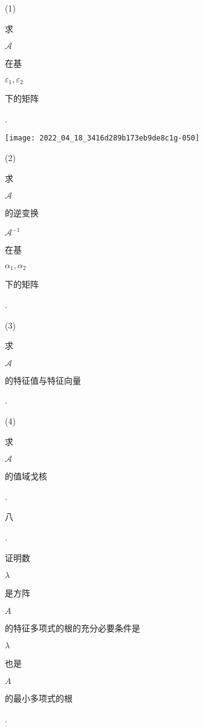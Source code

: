 \documentclass[10pt]{article}
\begin{document}
(1) \begin{CJK}{UTF8}{mj}求\end{CJK} $\mathscr{A}$ \begin{CJK}{UTF8}{mj}在基\end{CJK} $\varepsilon_{1}, \varepsilon_{2}$ \begin{CJK}{UTF8}{mj}下的矩阵\end{CJK}.

\texttt{[image: 2022\_04\_18\_3416d289b173eb9de8c1g-050]}

(2) \begin{CJK}{UTF8}{mj}求\end{CJK} $\mathscr{A}$ \begin{CJK}{UTF8}{mj}的逆变换\end{CJK} $\mathscr{A}^{-1}$ \begin{CJK}{UTF8}{mj}在基\end{CJK} $\alpha_{1}, \alpha_{2}$ \begin{CJK}{UTF8}{mj}下的矩阵\end{CJK}.

(3) \begin{CJK}{UTF8}{mj}求\end{CJK} $\mathscr{A}$ \begin{CJK}{UTF8}{mj}的特征值与特征向量\end{CJK}.

(4) \begin{CJK}{UTF8}{mj}求\end{CJK} $\mathscr{A}$ \begin{CJK}{UTF8}{mj}的值域戈核\end{CJK}.

\begin{CJK}{UTF8}{mj}八\end{CJK}. \begin{CJK}{UTF8}{mj}证明数\end{CJK} $\lambda$ \begin{CJK}{UTF8}{mj}是方阵\end{CJK} $A$ \begin{CJK}{UTF8}{mj}的特征多项式的根的充分必要条件是\end{CJK} $\lambda$ \begin{CJK}{UTF8}{mj}也是\end{CJK} $A$ \begin{CJK}{UTF8}{mj}的最小多项式的根\end{CJK}.
\end{document}
